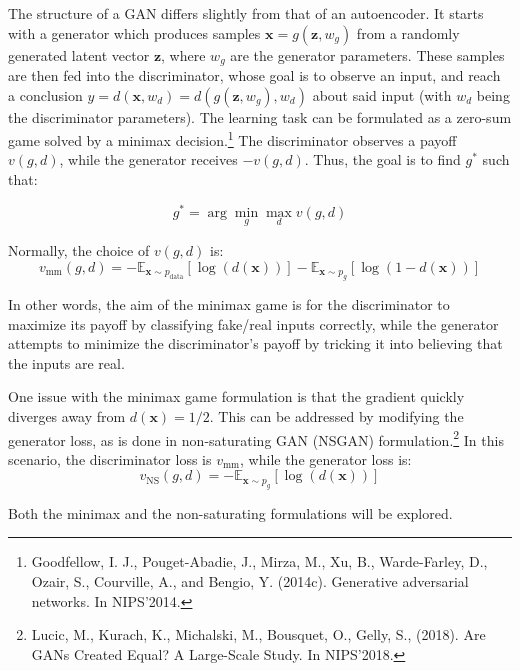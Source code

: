 \documentclass[11pt]{article} %
\begin{document}
\noindent The structure of a GAN differs slightly from that of an autoencoder. It starts with a generator which produces samples $\mathbf{x} = g(\mathbf{z},w_{g})$ from a randomly generated latent vector $\mathbf{z}$, where $w_{g}$ are the generator parameters. These samples are then fed into the discriminator, whose goal is to observe an input, and reach a conclusion $y = d(\mathbf{x}, w_{d}) = d(g(\mathbf{z},w_{g}), w_{d})$ about said input (with $w_{d}$ being the discriminator parameters). The learning task can be formulated as a zero-sum game solved by a minimax decision.\footnote{Goodfellow, I. J., Pouget-Abadie, J., Mirza, M., Xu, B., Warde-Farley, D., Ozair, S.,
Courville, A., and Bengio, Y. (2014c). Generative adversarial networks. In NIPS’2014.} The discriminator observes a payoff $v(g, d)$, while the generator receives $-v(g,d)$. Thus, the goal is to find $g^*$ such that:

\begin{equation}
    g^* = \arg\min_{g}\max_{d} v(g,d)
\end{equation}

Normally, the choice of $v(g, d)$ is:
\begin{equation}
    v_{\text{mm}}(g,d) = - \mathbb{E}_{\mathbf{x}\sim p_{\text{data}}}[\log(d(\mathbf{x}))] - \mathbb{E}_{\mathbf{x}\sim p_{g}}[\log(1 - d(\mathbf{x}))]
\end{equation}

In other words, the aim of the minimax game is for the discriminator to maximize its payoff by classifying fake/real inputs correctly, while the generator attempts to minimize the discriminator's payoff by tricking it into believing that the inputs are real.

\noindent One issue with the minimax game formulation is that the gradient quickly diverges away from $d(\mathbf{x}) = 1/2$. This can be addressed by modifying the generator loss, as is done in non-saturating GAN (NSGAN) formulation.\footnote{Lucic, M., Kurach, K., Michalski, M., Bousquet, O., Gelly, S.,  (2018). Are GANs Created Equal? A Large-Scale Study. In NIPS'2018.} In this scenario, the discriminator loss is $v_{\text{mm}}$, while the generator loss is:
\begin{equation}
    v_{\text{NS}}(g,d) = - \mathbb{E}_{\mathbf{x}\sim p_{g}}[\log(d(\mathbf{x}))]
\end{equation}

Both the minimax and the non-saturating formulations will be explored.

\end{document}
